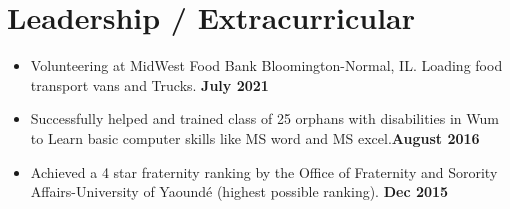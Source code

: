\documentclass[letterpaper,10pt]{article}
\newcommand{\resumeSubHeadingListStart}{\begin{itemize}[leftmargin=0.0in, label={}]}
\newcommand{\resumeSubHeadingListEnd}{\end{itemize}}
\begin{document}


\vspace{-1pt}   
\section{Leadership / Extracurricular}
     \begin{itemize}[leftmargin=*]
         \item Volunteering at MidWest Food Bank Bloomington-Normal, IL.   Loading food transport vans and Trucks. \hfill \textbf{July 2021}\vspace{-7pt}
         \item Successfully helped and trained class of 25 orphans with disabilities in Wum to Learn basic computer skills like MS word and MS excel.\hfill \textbf{August 2016}\vspace{-7pt}
         \item Achieved a 4 star fraternity ranking by the Office of Fraternity and Sorority Affairs-University of Yaound\'e (highest possible ranking). \hfill \textbf{Dec 2015}
     \end{itemize}
\end{document}
